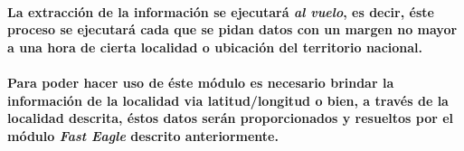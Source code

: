     \paragraph{La extracción de la información se ejecutará \emph{al vuelo}, es decir, éste proceso se ejecutará cada que se pidan datos con un margen no mayor a una hora de cierta localidad o ubicación del territorio nacional.}
    \paragraph{Para poder hacer uso de éste módulo es necesario brindar la información de la localidad via latitud/longitud o bien, a través de la localidad descrita, éstos datos serán proporcionados y resueltos por el módulo \textbf{\emph{Fast Eagle}} descrito anteriormente.}
      
